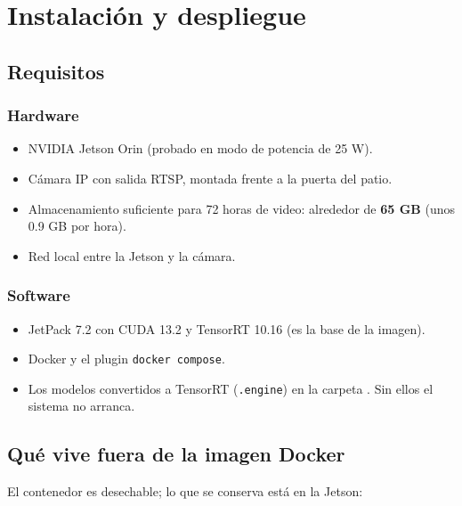 \chapter{Instalación y despliegue}
\label{cap:instalacion}

\section{Requisitos}

\subsection{Hardware}

\begin{itemize}
  \item NVIDIA Jetson Orin (probado en modo de potencia de 25 W).
  \item Cámara IP con salida RTSP, montada frente a la puerta del patio.
  \item Almacenamiento suficiente para 72 horas de video: alrededor de
        \textbf{65 GB} (unos 0.9 GB por hora).
  \item Red local entre la Jetson y la cámara.
\end{itemize}

\subsection{Software}

\begin{itemize}
  \item JetPack 7.2 con CUDA 13.2 y TensorRT 10.16 (es la base de la imagen).
  \item Docker y el plugin \texttt{docker compose}.
  \item Los modelos convertidos a TensorRT (\texttt{.engine}) en la carpeta
        . Sin ellos el sistema no arranca.
\end{itemize}

\section{Qué vive fuera de la imagen Docker}

El contenedor es desechable; lo que se conserva está en la Jetson:

